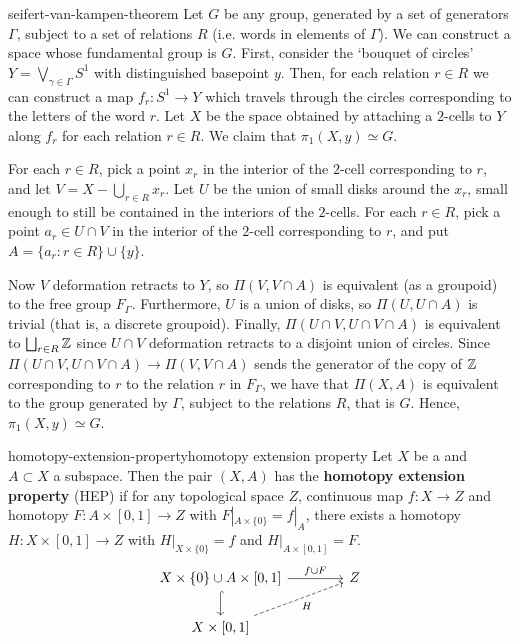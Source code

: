 \begin{example}{seifert-van-kampen-theorem}
    Let $G$ be any group, generated by a set of generators $\Gamma$, subject to a set of relations $R$ (i.e. words in elements of $\Gamma$). We can construct a space whose fundamental group is $G$. First, consider the `bouquet of circles' $Y = \bigvee_{\gamma \in \Gamma} S^1$ with distinguished basepoint $y$. Then, for each relation $r \in R$ we can construct a map $f_r : S^1 \to Y$ which travels through the circles corresponding to the letters of the word $r$. Let $X$ be the space obtained by attaching a $2$-cells to $Y$ along $f_r$ for each relation $r \in R$. We claim that $\pi_1(X, y) \simeq G$.
    
    For each $r \in R$, pick a point $x_r$ in the interior of the $2$-cell corresponding to $r$, and let $V = X - \bigcup_{r \in R} x_r$. Let $U$ be the union of small disks around the $x_r$, small enough to still be contained in the interiors of the $2$-cells. For each $r \in R$, pick a point $a_r \in U \cap V$ in the interior of the $2$-cell corresponding to $r$, and put $A = \{ a_r : r \in R \} \cup \{ y \}$.
    
    Now $V$ deformation retracts to $Y$, so $\Pi(V, V \cap A)$ is equivalent (as a groupoid) to the free group $F_\Gamma$. Furthermore, $U$ is a union of disks, so $\Pi(U, U \cap A)$ is trivial (that is, a discrete groupoid). Finally, $\Pi(U \cap V, U \cap V \cap A)$ is equivalent to $\bigsqcup_{r \in R} \mathbb{Z}$ since $U \cap V$ deformation retracts to a disjoint union of circles. Since $\Pi(U \cap V, U \cap V \cap A) \to \Pi(V, V \cap A)$ sends the generator of the copy of $\mathbb{Z}$ corresponding to $r$ to the relation $r$ in $F_\Gamma$, we have that $\Pi(X, A)$ is equivalent to the group generated by $\Gamma$, subject to the relations $R$, that is $G$. Hence, $\pi_1(X, y) \simeq G$.
\end{example}

\begin{topic}{homotopy-extension-property}{homotopy extension property}
    Let $X$ be a  and $A \subset X$ a subspace. Then the pair $(X, A)$ has the \textbf{homotopy extension property} (HEP) if for any topological space $Z$, continuous map $f : X \to Z$ and homotopy $F : A \times [0, 1] \to Z$ with $F|_{A \times \{ 0 \}} = f|_A$, there exists a homotopy $H : X \times [0, 1] \to Z$ with $H|_{X \times \{ 0 \}} = f$ and $H|_{A \times [0, 1]} = F$.
    \[ \begin{tikzcd}[column sep=4em]
        X \times \{ 0 \} \cup A \times [0, 1] \arrow[hookrightarrow]{d} \arrow{r}{f \cup F} & Z \\ X \times [0, 1] \arrow[swap, dashed]{ur}{H} &
    \end{tikzcd} \]
\end{topic}

